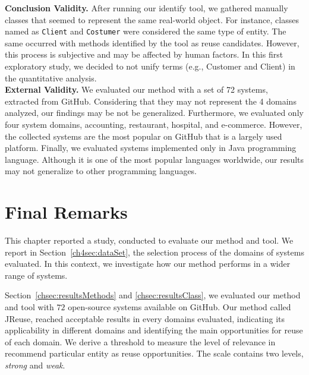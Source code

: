 \noindent
\textbf{Conclusion Validity.} After running our identify tool, we gathered manually classes that seemed to represent the same real-world object. For instance, classes named as \texttt{Client} and \texttt{Costumer} were considered the same type of entity. The same occurred with methods identified by the tool as reuse candidates. However, this process is subjective and  may be affected by human factors. In this first exploratory study, we decided to not unify terms (e.g., Customer and Client) in the quantitative analysis. \\

\noindent
\textbf{External Validity.} We evaluated our method with a set of 72 systems, extracted from GitHub. Considering that they may not represent the 4  domains analyzed, our findings may be not be generalized. Furthermore, we evaluated only four system domains, accounting, restaurant, hospital, and e-commerce. However, the collected systems are the most popular on GitHub that is a largely used platform. Finally, we evaluated systems implemented only in Java programming language. Although it is one of the most popular languages worldwide, our results may not generalize to other programming languages.

\section{Final Remarks}
\label{sec:finalRemarks}

This chapter reported a study, conducted to evaluate our method and tool. We report in Section~\ref{ch4sec:dataSet}, the selection process of the domains of systems evaluated. In this context, we investigate how our method  performs in a wider range of systems. %


Section~\ref{chsec:resultsMethods} and \ref{chsec:resultsClass}, we evaluated our method  and tool with $72$ open-source systems  available on GitHub. Our method called JReuse, reached acceptable results in every domains evaluated, indicating its applicability in different domains and  identifying  the main opportunities for reuse of  each domain. We derive a threshold to measure the level of relevance in recommend particular entity as reuse opportunities. The scale contains two levels, \textit{strong} and \textit{weak}. 





